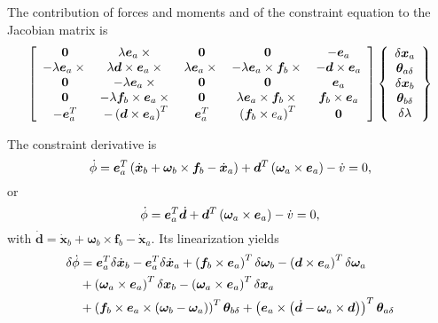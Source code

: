 \documentclass[10pt,fleqn,subeqn]{report}
\newcommand{\T}[1]{\bm{#1}}
\begin{document}
The contribution of forces and moments and of the constraint equation 
to the Jacobian matrix is
\begin{equation}
	\sqbr{\matr{ccccc}{
		\T{0} & \lambda \T{e}_a \times{} & \T{0} & \T{0} & - \T{e}_a \\
		- \lambda \T{e}_a \times{} & \lambda \T{d}\times\T{e}_a\times{} & 
			\lambda \T{e}_a \times{} & - \lambda \T{e}_a \times \T{f}_b\times{} &
			- \T{d}\times\T{e}_a \\
		\T{0} & - \lambda \T{e}_a \times{} & \T{0} & \T{0} & \T{e}_a \\
		\T{0} & - \lambda \T{f}_b \times \T{e}_a \times{} &
			\T{0} & \lambda \T{e}_a\times\T{f}_b\times{} & \T{f}_b\times\T{e}_a \\
		- \T{e}_a^T & - \plbr{\T{d} \times \T{e}_a}^T &
			\T{e}_a^T & \plbr{\T{f}_b\times{e}_a}^T & \T{0}
	}}\cubr{\cvvect{
		\delta\T{x}_a \\
		\T{\theta}_{a\delta} \\
		\delta\T{x}_b \\
		\T{\theta}_{b\delta} \\
		\delta\lambda
	}}
\end{equation}

The constraint derivative is
\begin{equation}
	\dot{\phi} = \T{e}_a^T\plbr{
		\dot{\T{x}}_b
		+ \T{\omega}_b \times \T{f}_b
		- \dot{\T{x}}_a
	} + \T{d}^T \plbr{\T{\omega}_a \times \T{e}_a} - \dot{v} = 0 ,
\end{equation}
or
\begin{equation}
	\dot{\phi} = \T{e}_a^T \dot{\T{d}}
	+ \T{d}^T \plbr{\T{\omega}_a \times \T{e}_a} - \dot{v} = 0 ,
\end{equation}
with $\dot{\T{d}}=\dot{\T{x}}_b+\T{\omega}_b\times\T{f}_b-\dot{\T{x}}_a$.
Its linearization yields
\begin{align}
	\delta\dot{\phi} &= \T{e}_a^T \delta\dot{\T{x}}_b
	- \T{e}_a^T \delta\dot{\T{x}}_a
	+ \plbr{\T{f}_b \times \T{e}_a}^T \delta\T{\omega}_b
	- \plbr{\T{d} \times \T{e}_a}^T \delta\T{\omega}_a \nonumber \\
	& + \plbr{\T{\omega}_a \times \T{e}_a}^T \delta\T{x}_b
	- \plbr{\T{\omega}_a \times \T{e}_a}^T \delta\T{x}_a \nonumber \\
	& + \plbr{\T{f}_b \times \T{e}_a \times \plbr{\T{\omega}_b - \T{\omega}_a}}^T \T{\theta}_{b\delta}
	+ \plbr{\T{e}_a \times \plbr{\dot{\T{d}} - \T{\omega}_a \times \T{d}}}^T \T{\theta}_{a\delta}
\end{align}
\end{document}
